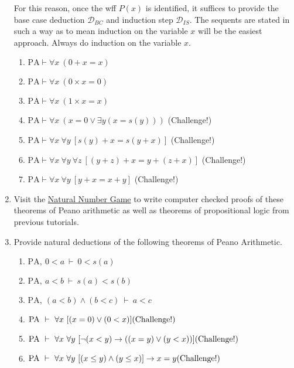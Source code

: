 \documentclass[11pt]{report}
\newcommand{\PA}{\text{PA}}
\begin{document}
\begin{enumerate}
	For this reason, once the wff $P(x)$ is identified, it suffices to provide the base case deduction $\mathcal{D}_{BC}$ and induction step $\mathcal{D}_{IS}$. The sequents are stated in such a way as to mean induction on the variable $x$ will be the easiest approach. Always do induction on the variable $x$.  
	
	\begin{enumerate}
		\item $\text{PA} \vdash \forall x \ (0 + x = x)$
		\item $\text{PA} \vdash \forall x \ (0 \times x = 0)$
		\item $\text{PA} \vdash \forall x \ (1 \times x = x)$
		\item $\text{PA} \vdash \forall x \ (x = 0 \lor \exists y (x = s(y)))$ \hfill (Challenge!)
		\item $\text{PA} \vdash \forall x \ \forall y \ [s(y) + x = s(y+x)]$ \hfill (Challenge!)
		\item $\text{PA} \vdash \forall x \ \forall y \ \forall z \ [(y + z) + x = y + (z + x)]$ \hfill (Challenge!)
		\item $\text{PA} \vdash \forall x \ \forall y \ [y + x = x + y]$ \hfill (Challenge!)
	\end{enumerate}

	\item Visit the \href{https://adam.math.hhu.de/\#/g/leanprover-community/nng4}{Natural Number Game} to write computer checked proofs of these theorems of Peano arithmetic as well as theorems of propositional logic from previous tutorials. 
	 
	\item Provide natural deductions of the following theorems of Peano Arithmetic.
	
		\begin{enumerate}
			\item $\PA , \ 0 < a \ \vdash \ 0 < s(a)$
			\item $\PA , \ a < b \ \vdash \ s(a) < s(b)$
			\item $\PA , \ (a < b) \land (b < c) \ \vdash \ a < c$
			\item $\PA \ \vdash \ \forall x \ [(x = 0) \lor (0 < x)] \hfill \text{(Challenge!)}$
			\item $\PA \ \vdash \ \forall x \ \forall y \ [\lnot(x<y) \to ((x=y) \lor (y<x))] \hfill \text{(Challenge!)}$
			\item $\PA \ \vdash \ \forall x \ \forall y \ [(x\leq y) \land (y\leq x)] \to x=y \hfill \text{(Challenge!)}$
		\end{enumerate}
	 
\end{enumerate}	
\end{document}
